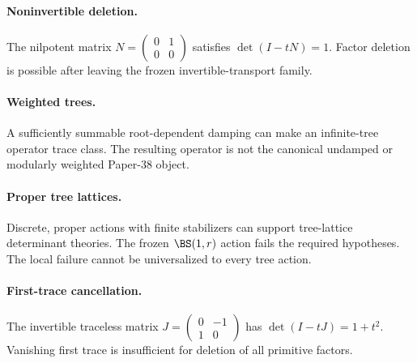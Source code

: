\paragraph{Noninvertible deletion.}
The nilpotent matrix
$N=\left(\begin{smallmatrix}0&1\\0&0\end{smallmatrix}\right)$ satisfies
$\det(I-tN)=1$.  Factor deletion is possible after leaving the frozen
invertible-transport family.

\paragraph{Weighted trees.}
A sufficiently summable root-dependent damping can make an infinite-tree
operator trace class.  The resulting operator is not the canonical undamped
or modularly weighted Paper-38 object.

\paragraph{Proper tree lattices.}
Discrete, proper actions with finite stabilizers can support tree-lattice
determinant theories.  The frozen $\BS(1,r)$ action fails the required
hypotheses.  The local failure cannot be universalized to every tree action.

\paragraph{First-trace cancellation.}
The invertible traceless matrix
$J=\left(\begin{smallmatrix}0&-1\\1&0\end{smallmatrix}\right)$ has
$\det(I-tJ)=1+t^2$.  Vanishing first trace is insufficient for deletion of all
primitive factors.
